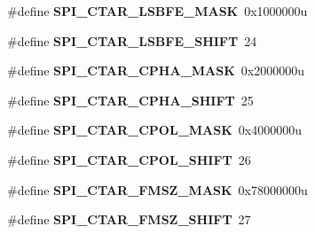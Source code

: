 \begin{DoxyCompactItemize}
\item 
\#define {\bfseries S\+P\+I\+\_\+\+C\+T\+A\+R\+\_\+\+L\+S\+B\+F\+E\+\_\+\+M\+A\+SK}~0x1000000u\hypertarget{group__SPI__Register__Masks_gadefae41f4962681a83ae61a653026dc2}{}\label{group__SPI__Register__Masks_gadefae41f4962681a83ae61a653026dc2}

\item 
\#define {\bfseries S\+P\+I\+\_\+\+C\+T\+A\+R\+\_\+\+L\+S\+B\+F\+E\+\_\+\+S\+H\+I\+FT}~24\hypertarget{group__SPI__Register__Masks_ga5f3c8977a22e59cab407497ba5e32dc9}{}\label{group__SPI__Register__Masks_ga5f3c8977a22e59cab407497ba5e32dc9}

\item 
\#define {\bfseries S\+P\+I\+\_\+\+C\+T\+A\+R\+\_\+\+C\+P\+H\+A\+\_\+\+M\+A\+SK}~0x2000000u\hypertarget{group__SPI__Register__Masks_ga562416b33f74ea5595e122d862093e51}{}\label{group__SPI__Register__Masks_ga562416b33f74ea5595e122d862093e51}

\item 
\#define {\bfseries S\+P\+I\+\_\+\+C\+T\+A\+R\+\_\+\+C\+P\+H\+A\+\_\+\+S\+H\+I\+FT}~25\hypertarget{group__SPI__Register__Masks_ga1a27d47d54bd5b51d69b21216b3662b4}{}\label{group__SPI__Register__Masks_ga1a27d47d54bd5b51d69b21216b3662b4}

\item 
\#define {\bfseries S\+P\+I\+\_\+\+C\+T\+A\+R\+\_\+\+C\+P\+O\+L\+\_\+\+M\+A\+SK}~0x4000000u\hypertarget{group__SPI__Register__Masks_ga128560de0ef72566ec53bb208e6ad5ef}{}\label{group__SPI__Register__Masks_ga128560de0ef72566ec53bb208e6ad5ef}

\item 
\#define {\bfseries S\+P\+I\+\_\+\+C\+T\+A\+R\+\_\+\+C\+P\+O\+L\+\_\+\+S\+H\+I\+FT}~26\hypertarget{group__SPI__Register__Masks_gac46d6c45f2f45383d1f6d062a570e81d}{}\label{group__SPI__Register__Masks_gac46d6c45f2f45383d1f6d062a570e81d}

\item 
\#define {\bfseries S\+P\+I\+\_\+\+C\+T\+A\+R\+\_\+\+F\+M\+S\+Z\+\_\+\+M\+A\+SK}~0x78000000u\hypertarget{group__SPI__Register__Masks_ga71b046a902929cf107f46e422092ff33}{}\label{group__SPI__Register__Masks_ga71b046a902929cf107f46e422092ff33}

\item 
\#define {\bfseries S\+P\+I\+\_\+\+C\+T\+A\+R\+\_\+\+F\+M\+S\+Z\+\_\+\+S\+H\+I\+FT}~27\hypertarget{group__SPI__Register__Masks_gaabebaa480c90d32ad8bc580ea2507b8e}{}\label{group__SPI__Register__Masks_gaabebaa480c90d32ad8bc580ea2507b8e}


\end{DoxyCompactItemize}
